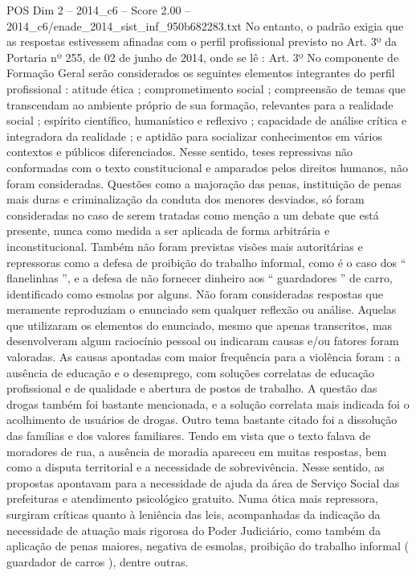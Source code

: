 \begin{textsample}{POS Dim 2 – 2014\_c6 – Score 2.00 – 2014\_c6/enade\_2014\_sist\_inf\_950b682283.txt}
No entanto, o padrão exigia que as respostas estivessem afinadas com o perfil profissional previsto no Art. 3º da Portaria nº 255, de 02 de junho de 2014, onde se lê : Art. 3º No componente de Formação Geral serão considerados os seguintes elementos integrantes do perfil profissional : atitude ética ; comprometimento social ; compreensão de temas que transcendam ao ambiente próprio de sua formação, relevantes para a realidade social ; espírito científico, humanístico e reflexivo ; capacidade de análise crítica e integradora da realidade ; e aptidão para socializar conhecimentos em vários contextos e públicos diferenciados.
Nesse sentido, teses repressivas não conformadas com o texto constitucional e amparados pelos direitos humanos, não foram consideradas.
Questões como a majoração das penas, instituição de penas mais duras e criminalização da conduta dos menores desviados, só foram consideradas no caso de serem tratadas como menção a um debate que está presente, nunca como medida a ser aplicada de forma arbitrária e inconstitucional.
Também não foram previstas visões mais autoritárias e repressoras como a defesa de proibição do trabalho informal, como é o caso dos “ flanelinhas ”, e a defesa de não fornecer dinheiro aos “ guardadores ” de carro, identificado como esmolas por alguns.
Não foram consideradas respostas que meramente reproduziam o enunciado sem qualquer reflexão ou análise.
Aquelas que utilizaram os elementos do enunciado, mesmo que apenas transcritos, mas desenvolveram algum raciocínio pessoal ou indicaram causas e/ou fatores foram valoradas.
As causas apontadas com maior frequência para a violência foram : a ausência de educação e o desemprego, com soluções correlatas de educação profissional e de qualidade e abertura de postos de trabalho.
A questão das drogas também foi bastante mencionada, e a solução correlata mais indicada foi o acolhimento de usuários de drogas.
Outro tema bastante citado foi a dissolução das famílias e dos valores familiares.
Tendo em vista que o texto falava de moradores de rua, a ausência de moradia apareceu em muitas respostas, bem como a disputa territorial e a necessidade de sobrevivência.
Nesse sentido, as propostas apontavam para a necessidade de ajuda da área de Serviço Social das prefeituras e atendimento psicológico gratuito.
Numa ótica mais repressora, surgiram críticas quanto à leniência das leis, acompanhadas da indicação da necessidade de atuação mais rigorosa do Poder Judiciário, como também da aplicação de penas maiores, negativa de esmolas, proibição do trabalho informal ( guardador de carros ), dentre outras.

\end{textsample}
